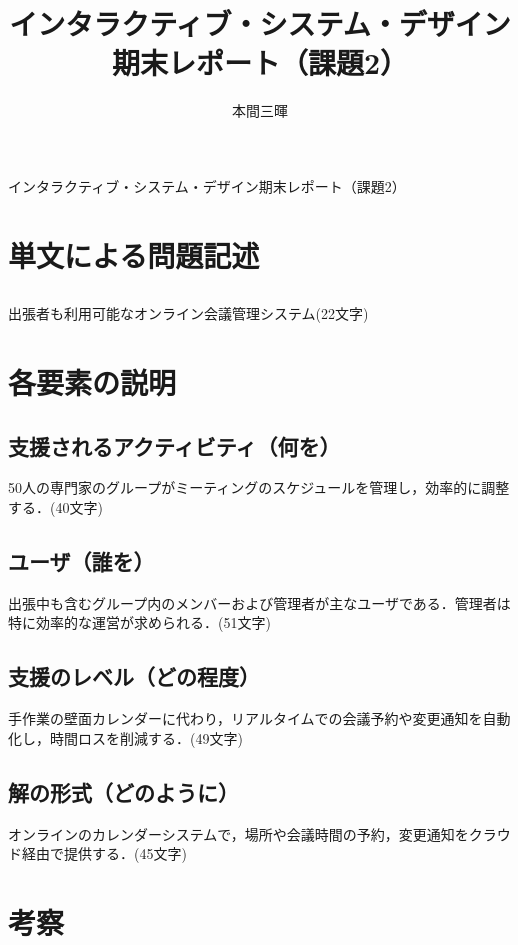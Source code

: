 \documentclass[titlepage,a4paper]{jsarticle}
\title{インタラクティブ・システム・デザイン期末レポート（課題2）}
\author{本間三暉}
\begin{document}
\maketitle
\begin{center}
  インタラクティブ・システム・デザイン期末レポート（課題2）
\end{center}

\section{単文による問題記述}
\renewcommand{\thesubsection}{\thesection)}
\subsection{ }
出張者も利用可能なオンライン会議管理システム(22文字)

\section{各要素の説明}
\renewcommand{\thesubsection}{\thesection-\arabic{subsection})}
\subsection{支援されるアクティビティ（何を）}
50人の専門家のグループがミーティングのスケジュールを管理し，効率的に調整する．(40文字)
\subsection{ユーザ（誰を）}
出張中も含むグループ内のメンバーおよび管理者が主なユーザである．管理者は特に効率的な運営が求められる．(51文字)
\subsection{支援のレベル（どの程度）}
手作業の壁面カレンダーに代わり，リアルタイムでの会議予約や変更通知を自動化し，時間ロスを削減する．(49文字)
\subsection{解の形式（どのように）}
オンラインのカレンダーシステムで，場所や会議時間の予約，変更通知をクラウド経由で提供する．(45文字)
\section{考察}
\renewcommand{\thesubsection}{\thesection)}
\end{document}
